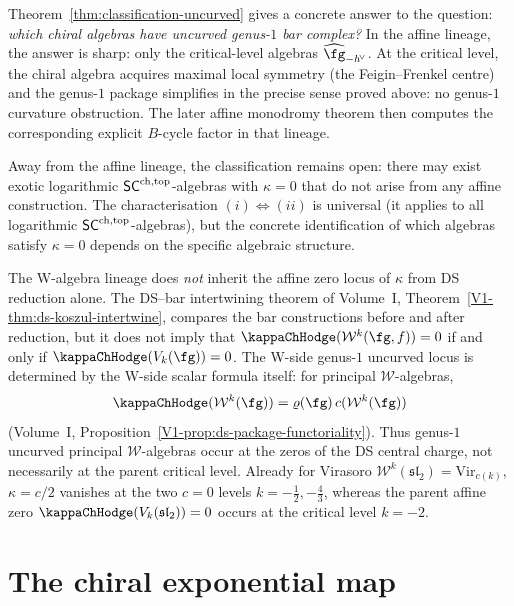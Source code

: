 \begin{remark}
\label{rem:critical-level-uncurved}
Theorem~\ref{thm:classification-uncurved} gives a concrete answer
to the question: \emph{which chiral algebras have uncurved
genus-$1$ bar complex?} In the affine lineage, the answer is
sharp: only the critical-level algebras $\widehat{\fg}_{-\hvee}$.
At the critical level, the chiral algebra acquires maximal local
symmetry (the Feigin--Frenkel centre) and the genus-$1$ package
simplifies in the precise sense proved above: no genus-$1$
curvature obstruction. The later affine monodromy theorem then
computes the corresponding explicit $B$-cycle factor in that
lineage.

Away from the affine lineage, the classification remains open:
there may exist exotic logarithmic $\mathsf{SC}^{\mathrm{ch,top}}$-algebras with
$\kappa = 0$ that do not arise from any affine construction.
The characterisation $(i) \Leftrightarrow (ii)$ is universal
(it applies to all logarithmic $\mathsf{SC}^{\mathrm{ch,top}}$-algebras), but the
concrete identification of which algebras satisfy $\kappa = 0$
depends on the specific algebraic structure.

The W-algebra lineage does \emph{not} inherit the affine zero locus
of $\kappa$ from DS reduction alone. The DS--bar intertwining theorem
of Volume~I, Theorem~\ref*{V1-thm:ds-koszul-intertwine}, compares the
bar constructions before and after reduction, but it does not imply
that $\kappaChHodge(\mathcal{W}^k(\fg,f))=0$ if and only if
$\kappaChHodge(V_k(\fg))=0$. The W-side genus-$1$ uncurved locus is
determined by the W-side scalar formula itself:
for principal $\mathcal{W}$-algebras,
\[
\kappaChHodge(\mathcal{W}^k(\fg))
= \varrho(\fg)\,c(\mathcal{W}^k(\fg))
\]
(Volume~I, Proposition~\ref*{V1-prop:ds-package-functoriality}).
Thus genus-$1$ uncurved principal $\mathcal{W}$-algebras occur at the
zeros of the DS central charge, not necessarily at the parent critical
level. Already for Virasoro
$\mathcal{W}^k(\mathfrak{sl}_2)=\mathrm{Vir}_{c(k)}$,
$\kappa = c/2$ vanishes at the two $c=0$ levels
$k=-\tfrac12,-\tfrac43$, whereas the parent affine zero
$\kappaChHodge(V_k(\mathfrak{sl}_2))=0$ occurs at the critical level
$k=-2$.
\end{remark}


\section{The chiral exponential map}
\label{sec:chiral-exponential-map}


